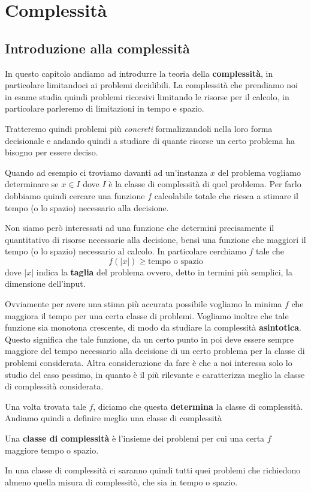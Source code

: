 \part{Complessità}

\chapter{Introduzione alla complessità}

In questo capitolo andiamo ad introdurre la teoria della
\textbf{complessità}, in particolare limitandoci ai problemi
decidibili. La complessità che prendiamo noi in esame studia
quindi problemi ricorsivi limitando le risorse per il calcolo,
in particolare parleremo di limitazioni in tempo e spazio.

Tratteremo quindi problemi più \emph{concreti} formalizzandoli
nella loro forma decisionale e andando quindi a studiare di
quante risorse un certo problema ha bisogno per essere deciso.

Quando ad esempio ci troviamo davanti ad un'instanza $x$ del
problema vogliamo determinare se $x \in I$ dove $I$ è la classe
di complessità di quel problema. Per farlo dobbiamo quindi
cercare una funzione $f$ calcolabile totale che riesca a stimare
il tempo (o lo spazio) necessario alla decisione.

Non siamo però interessati ad una funzione che determini
precisamente il quantitativo di risorse necessarie alla
decisione, bensì una funzione che maggiori il tempo (o lo spazio)
necessario al calcolo. In particolare cerchiamo $f$ tale che
\[ f(|x|) \geq \text{tempo o spazio} \]
dove $|x|$ indica la \textbf{taglia} del problema ovvero, detto
in termini più semplici, la dimensione dell'input.

Ovviamente per avere una stima più accurata possibile vogliamo
la minima $f$ che maggiora il tempo per una certa classe di
problemi. Vogliamo inoltre che tale funzione sia monotona
crescente, di modo da studiare la complessità
\textbf{asintotica}. Questo significa che tale funzione, da
un certo punto in poi deve essere sempre maggiore del tempo
necessario alla decisione di un certo problema per la classe
di problemi considerata. Altra considerazione da fare è che
a noi interessa solo lo studio del caso pessimo, in quanto è
il più rilevante e caratterizza meglio la classe di complessità
considerata.

Una volta trovata tale $f$, diciamo che questa \textbf{determina}
la classe di complessità. Andiamo quindi a definire meglio una
classe di complessità

\begin{definition}
	Una \textbf{classe di complessità} è l'insieme dei problemi
	per cui una certa $f$ maggiore tempo o spazio.
\end{definition}

In una classe di complessità ci saranno quindi tutti quei
problemi che richiedono almeno quella misura di complessitò, che
sia in tempo o spazio.

